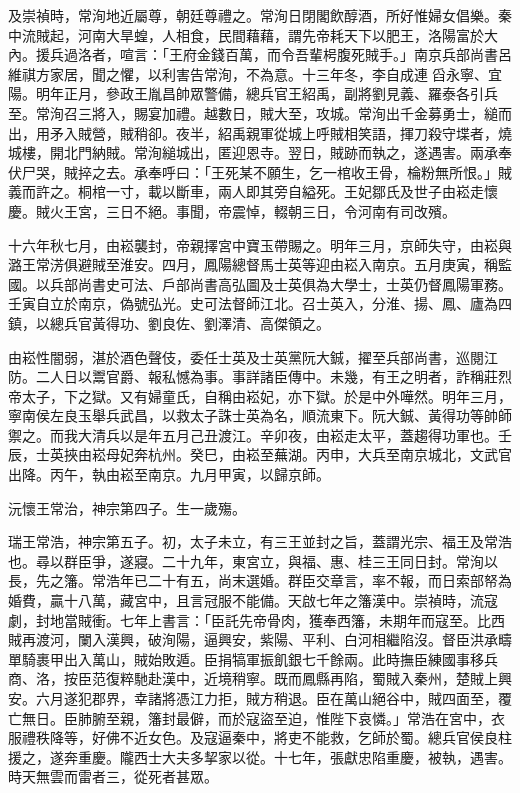 及崇禎時，常洵地近屬尊，朝廷尊禮之。常洵日閉閣飲醇酒，所好惟婦女倡樂。秦中流賊起，河南大旱蝗，人相食，民間藉藉，謂先帝耗天下以肥王，洛陽富於大內。援兵過洛者，喧言：「王府金錢百萬，而令吾輩枵腹死賊手。」南京兵部尚書呂維祺方家居，聞之懼，以利害告常洵，不為意。十三年冬，李自成連舀永寧、宜陽。明年正月，參政王胤昌帥眾警備，總兵官王紹禹，副將劉見義、羅泰各引兵至。常洵召三將入，賜宴加禮。越數日，賊大至，攻城。常洵出千金募勇士，縋而出，用矛入賊營，賊稍卻。夜半，紹禹親軍從城上呼賊相笑語，揮刀殺守堞者，燒城樓，開北門納賊。常洵縋城出，匿迎恩寺。翌日，賊跡而執之，遂遇害。兩承奉伏尸哭，賊捽之去。承奉呼曰：「王死某不願生，乞一棺收王骨，棆粉無所恨。」賊義而許之。桐棺一寸，載以斷車，兩人即其旁自縊死。王妃鄒氏及世子由崧走懷慶。賊火王宮，三日不絕。事聞，帝震悼，輟朝三日，令河南有司改殯。

十六年秋七月，由崧襲封，帝親擇宮中寶玉帶賜之。明年三月，京師失守，由崧與潞王常淓俱避賊至淮安。四月，鳳陽總督馬士英等迎由崧入南京。五月庚寅，稱監國。以兵部尚書史可法、戶部尚書高弘圖及士英俱為大學士，士英仍督鳳陽軍務。壬寅自立於南京，偽號弘光。史可法督師江北。召士英入，分淮、揚、鳳、廬為四鎮，以總兵官黃得功、劉良佐、劉澤清、高傑領之。

由崧性闇弱，湛於酒色聲伎，委任士英及士英黨阮大鋮，擢至兵部尚書，巡閱江防。二人日以鬻官爵、報私憾為事。事詳諸臣傳中。未幾，有王之明者，詐稱莊烈帝太子，下之獄。又有婦童氏，自稱由崧妃，亦下獄。於是中外嘩然。明年三月，寧南侯左良玉舉兵武昌，以救太子誅士英為名，順流東下。阮大鋮、黃得功等帥師禦之。而我大清兵以是年五月己丑渡江。辛卯夜，由崧走太平，蓋趨得功軍也。壬辰，士英挾由崧母妃奔杭州。癸巳，由崧至蕪湖。丙申，大兵至南京城北，文武官出降。丙午，執由崧至南京。九月甲寅，以歸京師。

沅懷王常治，神宗第四子。生一歲殤。

瑞王常浩，神宗第五子。初，太子未立，有三王並封之旨，蓋謂光宗、福王及常浩也。尋以群臣爭，遂寢。二十九年，東宮立，與福、惠、桂三王同日封。常洵以長，先之籓。常浩年已二十有五，尚末選婚。群臣交章言，率不報，而日索部帑為婚費，贏十八萬，藏宮中，且言冠服不能備。天啟七年之籓漢中。崇禎時，流寇劇，封地當賊衝。七年上書言：「臣託先帝骨肉，獲奉西籓，未期年而寇至。比西賊再渡河，闌入漢興，破洵陽，逼興安，紫陽、平利、白河相繼陷沒。督臣洪承疇單騎裹甲出入萬山，賊始敗遁。臣捐犒軍振飢銀七千餘兩。此時撫臣練國事移兵商、洛，按臣范復粹馳赴漢中，近境稍寧。既而鳳縣再陷，蜀賊入秦州，楚賊上興安。六月遂犯郡界，幸諸將憑江力拒，賊方稍退。臣在萬山絕谷中，賊四面至，覆亡無日。臣肺腑至親，籓封最僻，而於寇盜至迫，惟陛下哀憐。」常浩在宮中，衣服禮秩降等，好佛不近女色。及寇逼秦中，將吏不能救，乞師於蜀。總兵官侯良柱援之，遂奔重慶。隴西士大夫多挈家以從。十七年，張獻忠陷重慶，被執，遇害。時天無雲而雷者三，從死者甚眾。

